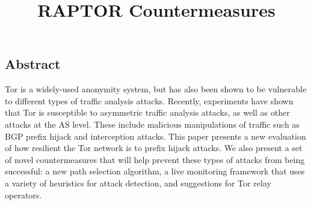 \documentclass[letterpaper,twocolumn,10pt]{article}
\begin{document}
\date{}

\title{\Large \bf RAPTOR Countermeasures}


\maketitle

\thispagestyle{empty}

\subsection*{Abstract}
Tor is a widely-used anonymity system, but has also been shown to be vulnerable to 
different types of traffic analysis attacks.  Recently, experiments have shown that 
Tor is susceptible to asymmetric traffic analysis attacks, as well as other attacks 
at the AS level.  These include malicious manipulations of traffic such as BGP prefix 
hijack and interception attacks.  
This paper presents a new evaluation of how resilient the Tor network is to prefix 
hijack attacks.  We also present a set of novel countermeasures that will help 
prevent these types of attacks from being successful: a new path selection algorithm, 
a live monitoring framework that uses a variety of heuristics for attack detection, and 
suggestions for Tor relay operators. 










{\footnotesize 
}

\end{document}
